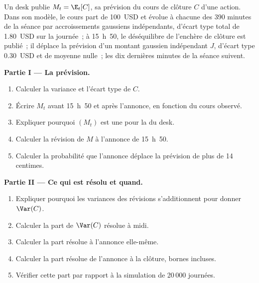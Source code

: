 \begin{problem}\label{pb:qm:probability-at-speed:1}
Un desk publie $M_t = \E_t[C]$, sa prévision du cours de clôture $C$ d'une action. Dans son modèle,
le cours part de 100~USD et évolue à chacune des 390 minutes de la séance par
accroissements gaussiens indépendants, d'écart type total de 1.80~USD sur la journée~; à
15~h~50, le déséquilibre de l'enchère de clôture est publié~; il déplace la prévision
d'un montant gaussien indépendant $J$, d'écart type 0.30~USD et de moyenne nulle~; les dix
dernières minutes de la séance suivent.

\medskip\noindent\textbf{Partie I --- La prévision.}
\begin{enumerate}
\item Calculer la variance et l'écart type de $C$.
\item Écrire $M_t$ avant 15~h~50 et après l'annonce, en fonction du cours observé.
\item Expliquer pourquoi $(M_t)$ est une  pour la  du desk.
\item Calculer la révision de $M$ à l'annonce de 15~h~50.
\item Calculer la probabilité que l'annonce déplace la prévision de plus de 14 centimes.
\end{enumerate}

\medskip\noindent\textbf{Partie II --- Ce qui est résolu et quand.}
\begin{enumerate}[resume]
\item Expliquer pourquoi les variances des révisions s'additionnent pour donner $\Var(C)$.
\item Calculer la part de $\Var(C)$ résolue à midi.
\item Calculer la part résolue à l'annonce elle-même.
\item Calculer la part résolue de l'annonce à la clôture, bornes incluses.
\item Vérifier cette part par rapport à la simulation de 20\,000 journées.
\end{enumerate}


\end{problem}
